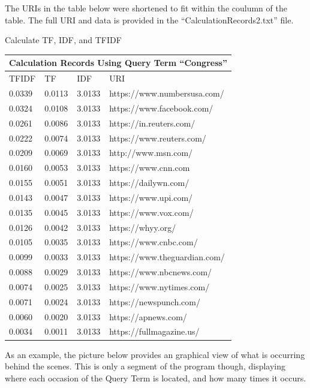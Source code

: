 \documentclass[11pt]{scrartcl} %
\begin{document}
\pagebreak
\tabto{2.0cm} The URIs in the table below were shortened to fit within the coulumn of the table. The full URI and data is provided in the ``CalculationRecords2.txt'' file. 
\newline \newline 
\begin{center}
\begin{LARGE} Calculate TF, IDF, and TFIDF  \end{LARGE} \newline \newline
\begin{tabular}{ |p{1cm}||p{1cm}|p{1cm}|p{6cm}|  }
 \hline
 \multicolumn{4}{|c|}{Calculation Records Using Query Term ``Congress''} \\
 \hline
 TFIDF & TF & IDF & URI\\
 \hline
0.0339   & 0.0113   &3.0133&   https://www.numbersusa.com/ \\
0.0324 & 0.0108  & 3.0133   &https://www.facebook.com/ \\
0.0261 & 0.0086 & 3.0133&  https://in.reuters.com/ \\
0.0222 & 0.0074 & 3.0133& https://www.reuters.com/\\
0.0209&   0.0069  & 3.0133&http://www.msn.com/\\
0.0160& 0.0053  & 3.0133   &https://www.cnn.com\\
0.0155& 0.0051  & 3.0133&https://dailywn.com/\\
0.0143& 0.0047  & 3.0133&https://www.upi.com/\\
0.0135& 0.0045  & 3.0133&https://www.vox.com/\\
0.0126& 0.0042  & 3.0133&https://whyy.org/\\
0.0105& 0.0035  & 3.0133&https://www.cnbc.com/\\
0.0099& 0.0033  & 3.0133&https://www.theguardian.com/\\
0.0088& 0.0029  & 3.0133&https://www.nbcnews.com/\\
0.0074& 0.0025  & 3.0133&https://www.nytimes.com/\\
0.0071& 0.0024  & 3.0133&https://newspunch.com/\\
0.0060& 0.0020  & 3.0133&https://apnews.com/\\
0.0034& 0.0011  & 3.0133&https://fullmagazine.us/\\
 \hline
\end{tabular}
\end{center}
\bigskip
\tabto{2.0cm} As an example, the picture below provides an graphical view of what is occurring behind the scenes. This is only a segment of the program though, displaying where each occasion of the Query Term is located, and how many times it occurs.
\end{document}
